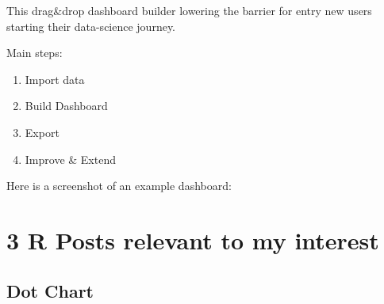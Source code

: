 \documentclass[
  letterpaper,
  DIV=11,
  numbers=noendperiod]{scrreprt}
\providecommand{\tightlist}{%
  \setlength{\itemsep}{0pt}\setlength{\parskip}{0pt}}\usepackage{longtable,booktabs,array}
\begin{document}
This drag\&drop dashboard builder lowering the barrier for entry new
users starting their data-science journey.

Main steps:

\begin{enumerate}
\def\labelenumi{\arabic{enumi}.}
\tightlist
\item
  Import data
\item
  Build Dashboard
\item
  Export
\item
  Improve \& Extend
\end{enumerate}

Here is a screenshot of an example dashboard:

\hypertarget{r-posts-relevant-to-my-interest}{%
\section{3 R Posts relevant to my
interest}\label{r-posts-relevant-to-my-interest}}

\hypertarget{dot-chart}{%
\subsection{Dot Chart}\label{dot-chart}}
\end{document}
